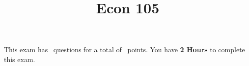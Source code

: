 

\usepackage{color}
\lstset{numbers=left}


\printanswers

\title{Econ 105}
\maketitle



\begin{center}
    This exam has \numquestions\ questions for a total of \numpoints\
    points. You have {\bf 2 Hours} to complete this exam.
\end{center}

%
%
%
%


